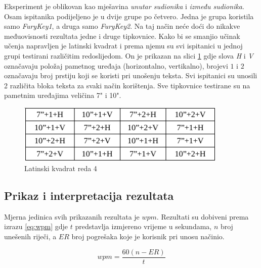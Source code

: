 \documentclass[times, utf8, zavrsni]{fer}
\begin{document}
Eksperiment je oblikovan kao mješavina \emph{unutar sudionika} i \emph{između sudionika}. Osam ispitanika podijeljeno je u dvije grupe po četvero. Jedna je grupa koristila samo \emph{FuryKey1}, a druga samo \emph{FuryKey2}. Na taj način neće doći do nikakve međuovisnosti rezultata jedne i druge tipkovnice. Kako bi se smanjio učinak učenja napravljen je latinski kvadrat i prema njemu su svi ispitanici u jednoj grupi testirani različitim redoslijedom. On je prikazan na slici \ref{fig:lat} gdje slova \emph{H} i \emph{V} označavaju položaj pametnog uređaja (horizontalno, vertikalno), brojevi $1$ i $2$ označavaju broj prstiju koji se koristi pri unošenju teksta. Svi ispitanici su unosili 2 različita bloka teksta za svaki način korištenja. Sve tipkovnice testirane su na pametnim uređajima veličina 7" i 10".

\begin{figure}[htb]
\centering
\includegraphics[width=10cm]{img/lat.png}
\caption{Latinski kvadrat reda 4}
\label{fig:lat}
\end{figure}

\subsection{Prikaz i interpretacija rezultata}
Mjerna jedinica svih prikazanih rezultata je $wpm$. Rezultati su dobiveni prema izrazu \ref{eq:wpm} gdje $t$ predstavlja izmjereno vrijeme u sekundama, $n$ broj unešenih riječi, a $ER$ broj pogrešaka koje je korisnik pri unosu načinio.

\begin{equation}
\label{eq:wpm}
wpm = \frac{60(n-ER)}{t}
\end{equation}
\end{document}
